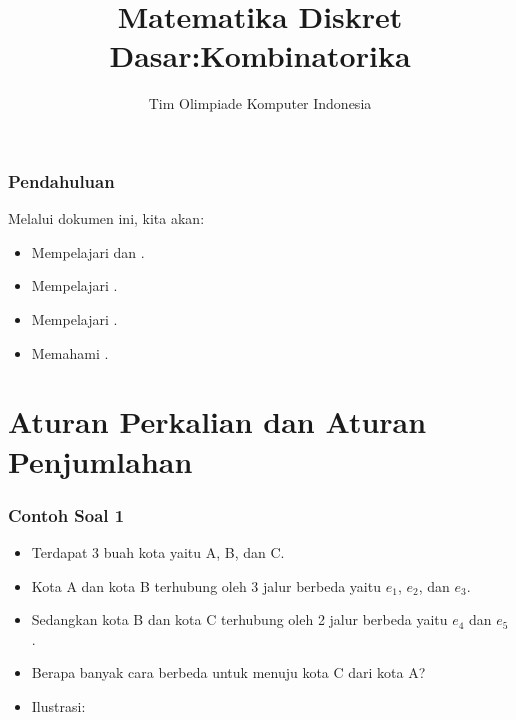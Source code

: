 
\usepackage{tikz}

\title{Matematika Diskret Dasar:\newline Kombinatorika}
\author{Tim Olimpiade Komputer Indonesia}
\date{}



\begin{frame}
\titlepage
\end{frame}

\begin{frame}
\frametitle{Pendahuluan}
Melalui dokumen ini, kita akan:
\begin{itemize}
  \item Mempelajari  dan .
  \item Mempelajari .
  \item Mempelajari .
  \item Memahami .
\end{itemize}
\end{frame}

\section{Aturan Perkalian dan Aturan Penjumlahan}
\frame{\sectionpage}

\begin{frame}
\frametitle{Contoh Soal 1}
\begin{itemize}
  \item Terdapat 3 buah kota yaitu A, B, dan C.
  \item Kota A dan kota B terhubung oleh 3 jalur berbeda yaitu $e_{1}$, $e_{2}$, dan $e_{3}$.
  \item Sedangkan kota B dan kota C terhubung oleh 2 jalur berbeda yaitu $e_{4}$ dan $e_{5}$.
  \item Berapa banyak cara berbeda untuk menuju kota C dari kota A?
  \item Ilustrasi: 
  \newline
\end{itemize}
\end{frame}

